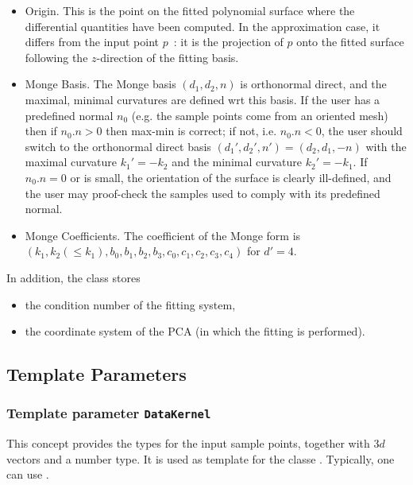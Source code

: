 \begin{itemize}
\item Origin. This is the point on the fitted polynomial surface
where the differential quantities have been computed. In the
approximation case, it differs from the input point $p$~: it is the
projection of $p$ onto the fitted surface following the $z$-direction
of the fitting basis.

\item Monge Basis. The Monge basis $(d_1,d_2,n)$ is orthonormal
direct, and the maximal, minimal curvatures are defined wrt this
basis. If the user has a predefined normal $n_0$ (e.g. the sample
points come from an oriented mesh) then if $n_0 . n >0$ then max-min
is correct; if not, i.e. $n_0 . n <0$, the user should switch to the
orthonormal direct basis $(d_1',d_2',n')=(d_2,d_1,-n)$ with the
maximal curvature $k_1'=-k_2$ and the minimal curvature
$k_2'=-k_1$. If $n_0 . n =0$ or is small, the orientation of the
surface is clearly ill-defined, and the user may proof-check the
samples used to comply with its predefined normal.


\item Monge Coefficients.
The coefficient of the Monge form is $(k_1, k_2 (\leq k_1),
b_0, b_1, b_2, b_3, c_0, c_1, c_2, c_3, c_4)$ for $d' = 4$.

\end{itemize}

In addition, the class  stores 
\begin{itemize}
\item
the condition number of the fitting system,
\item 
the coordinate system of the PCA (in which the fitting is performed).
\end{itemize}

\subsection{Template Parameters}

\subsubsection{Template parameter \texttt{DataKernel}}

This concept provides the types for the input sample points, together
with $3d$ vectors and a number type. It is used as template for the
classe  . Typically, one can use
.

